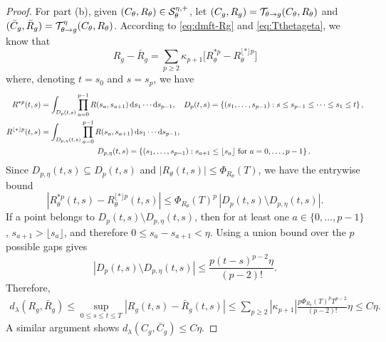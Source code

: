 \begin{proof}
For part (b), given $(C_\theta,R_\theta) \in \mathcal{S}_\theta^{\eta,+}$, let
$(C_g,R_g)=\mathcal{T}_{\theta\to g}(C_\theta,R_\theta)$
and $(\bar C_g,\bar R_g)=\mathcal{T}_{\theta\to g}^\eta(C_\theta,R_\theta)$. According
to \eqref{eq:dmft-Rg} and \eqref{eq:Tthetageta}, we know that
\[R_g-\bar R_g=\sum_{p \geq 2} \kappa_{p+1}\Big[R_\theta^{\ast p}-
R_\theta^{\lfloor\ast\rfloor p}\Big]\]
where, denoting $t=s_0$ and $s=s_p$, we have
\begin{align*}
R^{\ast p}(t,s)&= \int_{D_p(t,s)} \prod_{a=0}^{p-1}R(s_a,s_{a+1})\, \mathrm{d}
s_1\cdots\mathrm{d} s_{p-1},\quad D_p(t,s)=\left\{(s_1,\ldots,s_{p-1}):s \leq s_{p-1}\leq\cdots\leq s_1\leq t
\right\},\\
R^{\lfloor\ast\rfloor p}(t,s)&=\int_{D_{p,\eta}(t,s)} \prod_{a=0}^{p-1}
R(s_a,s_{a+1})\, \mathrm{d} s_1\cdots\mathrm{d} s_{p-1},\\
&\hspace{1in}D_{p,\eta}(t,s)=
\left\{(s_1,\ldots,s_{p-1}):s_{a+1} \leq \lfloor s_a\rfloor
\text{ for } a=0,\ldots,p-1 \right\}.
\end{align*}
Since $D_{p,\eta}(t,s)\subseteq D_p(t,s)$ and
$|R_\theta(t,s)|\le \Phi_{R_\theta}(T)$, we have the entrywise bound
\[
\left|R_\theta^{\ast p}(t,s) - R_\theta^{\lfloor \ast \rfloor p}(t,s) \right|
\leq \Phi_{R_\theta}(T)^p\, \left|D_p(t,s)\setminus D_{p,\eta}(t,s)\right|.
\]
If a point belongs to $D_p(t,s)\setminus D_{p,\eta}(t,s)$, then for at least one $a\in\{0,\ldots,p-1\}$,
$s_{a+1}>\lfloor s_a\rfloor$,
and therefore
$0\leq s_a-s_{a+1}<\eta$.
Using a union bound over the $p$ possible gaps gives
\[
\left|D_p(t,s)\setminus D_{p,\eta}(t,s)\right| \leq \frac{p(t-s)^{p-2}\eta}{(p-2)!}.
\]
Therefore, 
\begin{align*}
d_\lambda(R_g, \bar R_g)
\le \sup_{0 \leq s \leq t \leq T} |R_g(t,s)-\bar R_g(t,s)|
\leq
\sum_{p \geq 2} |\kappa_{p+1}|\frac{p\Phi_{R_\theta}(T)^pT^{p-2}}{(p-2)!}\eta
\le C\eta.
\end{align*}
A similar argument shows $d_\lambda(C_g, \bar C_g) \le C\eta$.
\end{proof}

